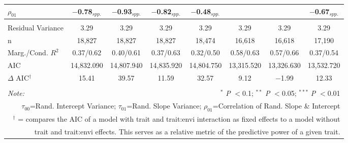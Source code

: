 \documentclass[12pt, letterpaper]{article}
\begin{document}
\begin{table}[h]
{\begin{tabular}{lccccccc}
  $\rho_{01}$ & $-$0.78$_{spp.}$ & $-$0.93$_{spp.}$ & $-$0.82$_{spp.}$ & $-$0.48$_{spp.}$ & & & $-$0.67$_{spp.}$ \\
\hline \\[-1.8ex] 
\rowcolor[gray]{.95} Residual Variance & 3.29 & 3.29 & 3.29 & 3.29 & 3.29 & 3.29 & 3.29\\
n & 18,827 & 18,827 & 18,827 & 18,474 & 16,618 & 16,618 & 17,190\\ 
\rowcolor[gray]{.95} Marg./Cond. $R^2$ & 0.37/0.62 & 0.40/0.61 & 0.37/0.63 & 0.32/0.50 & 0.58/0.63 & 0.57/0.66 & 0.37/0.54 \\
AIC   & 14,832.090 & 14,807.940 & 14,835.920 & 14,804.750 & 13,315.520 & 13,326.630 & 13,532.720 \\ 
\hline 
\rowcolor[gray]{.95}$\Delta$ AIC$^\dagger$  & 15.41 & 39.57 & 11.59 & 32.57 & 9.12 & $-$1.99 & 12.33 \\
\hline 
\hline \\[-1.8ex] 
\textit{Note:}  & \multicolumn{7}{r}{$^{*}$ \textit{P} $<$0.1; $^{**}$ \textit{P} $<$0.05; $^{***}$ \textit{P} $<$0.01}\\
\multicolumn{8}{r}{$\tau_{00}$=Rand. Intercept Variance; $\tau_{01}$=Rand. Slope Variance; $\rho_{01}$=Correlation of Rand. Slope \& Intercept}\\ 
\multicolumn{8}{r}{$^\dagger$ = compares the AIC of a model with trait and trait:envi interaction as fixed effects to a model without}\\
\multicolumn{8}{r}{trait and trait:envi effects. This serves as a relative metric of the predictive power of a given trait.}
\end{tabular}} 
\end{table} 
\end{document}
